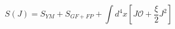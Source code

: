 \begin{equation}
S(J)=S_{YM}+S_{GF+FP}+\int d^{4}x\left[ J\mathcal{O} +\frac{\xi }{2}%
J^{2}\right]  \label{sj}
\end{equation}

